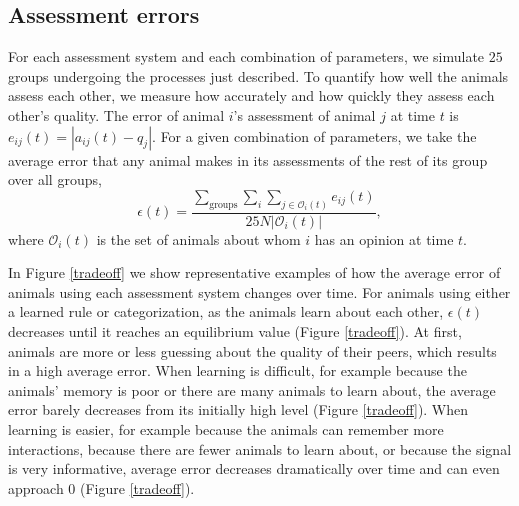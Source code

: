 \subsection{Assessment errors }
For each assessment system and each combination of parameters, we simulate $25$ groups undergoing the processes just described.  To quantify how well the animals assess each other, we measure how accurately and how quickly they assess each other's quality. The error of animal $i$'s assessment of animal $j$ at time $t$ is $e_{ij}(t)=|a_{ij}(t)-q_j|$. For a given combination of parameters, we take the average error that any animal makes in its assessments of the rest of its group over all groups, 
\begin{equation*}
\epsilon(t) = \frac{\sum_{\text{groups}}\sum_i\sum_{j\in \mathscr{O}_i(t)}e_{ij}(t)}{25N|\mathscr{O}_i(t)|},
\end{equation*}
where $\mathscr{O}_i(t)$ is the set of animals about whom $i$ has an opinion at time $t$.

In Figure \ref{tradeoff} we show representative examples of how the average error of animals using each assessment system changes over time.  For animals using either a learned rule or categorization, as the animals learn about each other, $\epsilon(t)$ decreases until it reaches an equilibrium value (Figure \ref{tradeoff}). At first, animals are more or less guessing about the quality of their peers, which results in a high average error. When learning is difficult, for example because the animals' memory is poor or there are many animals to learn about, the average error barely decreases from its initially high level (Figure \ref{tradeoff}). When learning is easier, for example because the animals can remember more interactions, because there are fewer animals to learn about, or because the signal is very informative, average error decreases dramatically over time and can even approach $0$ (Figure \ref{tradeoff}).  

